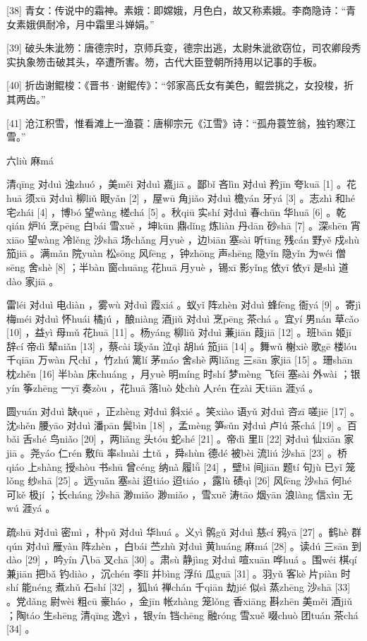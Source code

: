 \documentclass[12pt,UTF8]{ctexbook}
\begin{document}
[38] 青女：传说中的霜神。素娥：即嫦娥，月色白，故又称素娥。李商隐诗：“青女素娥俱耐冷，月中霜里斗婵娟。”

[39] 破头朱泚笏：唐德宗时，京师兵变，德宗出逃，太尉朱泚欲窃位，司农卿段秀实执象笏击破其头，卒遭所害。笏，古代大臣登朝所持用以记事的手板。

[40] 折齿谢鲲梭：《晋书·谢鲲传》：“邻家高氏女有美色，鲲尝挑之，女投梭，折其两齿。”

[41] 沧江积雪，惟看滩上一渔蓑：唐柳宗元《江雪》诗：“孤舟蓑笠翁，独钓寒江雪。”





六liù 麻má


清qīng 对duì 浊zhuó ，美měi 对duì 嘉jiā 。鄙bǐ 吝lìn 对duì 矜jīn 夸kuā [1] 。花huā 须xū 对duì 柳liǔ 眼yǎn [2] ，屋wū 角jiǎo 对duì 檐yán 牙yá [3] 。志zhì 和hé 宅zhái [4] ，博bó 望wàng 槎chá [5] 。秋qiū 实shí 对duì 春chūn 华huā [6] 。乾qián 炉lú 烹pēng 白bái 雪xuě ，坤kūn 鼎dǐng 炼liàn 丹dān 砂shā [7] 。深shēn 宵xiāo 望wàng 冷lěng 沙shā 场chǎng 月yuè ，边biān 塞sài 听tīng 残cán 野yě 戍shù 笳jiā 。满mǎn 院yuàn 松sōng 风fēng ，钟zhōng 声shēng 隐yǐn 隐yǐn 为wéi 僧sēng 舍shè [8] ；半bàn 窗chuāng 花huā 月yuè ，锡xī 影yǐng 依yī 依yī 是shì 道dào 家jiā 。

雷léi 对duì 电diàn ，雾wù 对duì 霞xiá 。蚁yǐ 阵zhèn 对duì 蜂fēng 衙yá [9] 。寄jì 梅méi 对duì 怀huái 橘jú ，酿niàng 酒jiǔ 对duì 烹pēng 茶chá 。宜yí 男nán 草cǎo [10] ，益yì 母mǔ 花huā [11] 。杨yáng 柳liǔ 对duì 蒹jiān 葭jiā [12] 。班bān 姬jī 辞cí 帝dì 辇niǎn [13] ，蔡cài 琰yǎn 泣qì 胡hú 笳jiā [14] 。舞wǔ 榭xiè 歌gē 楼lóu 千qiān 万wàn 尺chǐ ，竹zhú 篱lí 茅máo 舍shè 两liǎng 三sān 家jiā [15] 。珊shān 枕zhěn [16] 半bàn 床chuáng ，月yuè 明míng 时shí 梦mèng 飞fēi 塞sài 外wài ；银yín 筝zhēng 一yī 奏zòu ，花huā 落luò 处chù 人rén 在zài 天tiān 涯yá 。

圆yuán 对duì 缺quē ，正zhèng 对duì 斜xié 。笑xiào 语yǔ 对duì 咨zī 嗟jiē [17] 。沈shěn 腰yāo 对duì 潘pān 鬓bìn [18] ，孟mèng 笋sǔn 对duì 卢lú 茶chá [19] 。百bǎi 舌shé 鸟niǎo [20] ，两liǎng 头tóu 蛇shé [21] 。帝dì 里lǐ [22] 对duì 仙xiān 家jiā 。尧yáo 仁rén 敷fū 率shuài 土tǔ ，舜shùn 德dé 被bèi 流liú 沙shā [23] 。桥qiáo 上shàng 授shòu 书shū 曾céng 纳nà 履lǚ [24] ，壁bì 间jiān 题tí 句jù 已yǐ 笼lǒng 纱shā [25] 。远yuǎn 塞sài 迢tiáo 迢tiáo ，露lù 碛qì [26] 风fēng 沙shā 何hé 可kě 极jí ；长cháng 沙shā 渺miǎo 渺miǎo ，雪xuě 涛tāo 烟yān 浪làng 信xìn 无wú 涯yá 。

疏shū 对duì 密mì ，朴pǔ 对duì 华huá 。义yì 鹘gǔ 对duì 慈cí 鸦yā [27] 。鹤hè 群qún 对duì 雁yàn 阵zhèn ，白bái 苎zhù 对duì 黄huáng 麻má [28] 。读dú 三sān 到dào [29] ，吟yín 八bā 叉chā [30] 。肃sù 静jìng 对duì 喧xuān 哗huá 。围wéi 棋qí 兼jiān 把bǎ 钓diào ，沉chén 李lǐ 并bìng 浮fú 瓜guā [31] 。羽yǔ 客kè 片piàn 时shí 能néng 煮zhǔ 石shí [32] ，狐hú 禅chán 千qiān 劫jié 似sì 蒸zhēng 沙shā [33] 。党dǎng 尉wèi 粗cū 豪háo ，金jīn 帐zhàng 笼lǒng 香xiāng 斟zhēn 美měi 酒jiǔ ；陶táo 生shēng 清qīng 逸yì ，银yín 铛chēng 融róng 雪xuě 啜chuò 团tuán 茶chá [34] 。
\end{document}
